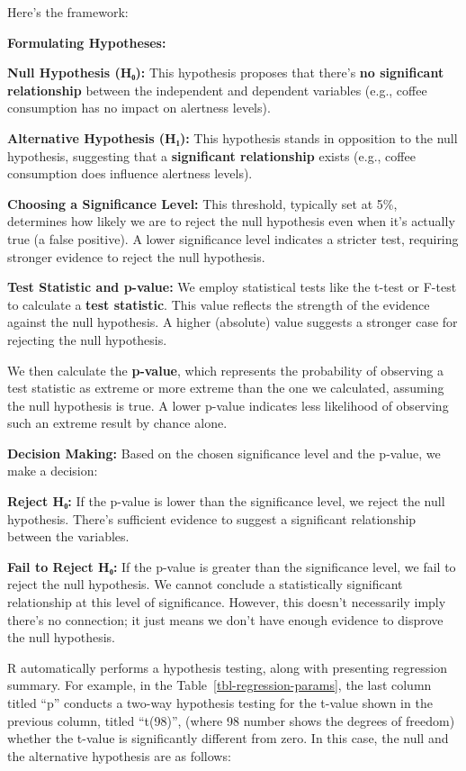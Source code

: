 \documentclass[
  letterpaper,
  paper =a4,
  twoside,
  openright,
  headsepline,
  footsepline,
  listof = totocnumbered,
  chapterprefix = true,
  firstiscover,
  parskip = full*]{scrbook}
\begin{document}
Here's the framework:

\textbf{Formulating Hypotheses:}

\textbf{Null Hypothesis (H₀):} This hypothesis proposes that there's
\textbf{no significant relationship} between the independent and
dependent variables (e.g., coffee consumption has no impact on alertness
levels).

\textbf{Alternative Hypothesis (H₁):} This hypothesis stands in
opposition to the null hypothesis, suggesting that a \textbf{significant
relationship} exists (e.g., coffee consumption does influence alertness
levels).

\textbf{Choosing a Significance Level:} This threshold, typically set at
5\%, determines how likely we are to reject the null hypothesis even
when it's actually true (a false positive). A lower significance level
indicates a stricter test, requiring stronger evidence to reject the
null hypothesis.

\textbf{Test Statistic and p-value:} We employ statistical tests like
the t-test or F-test to calculate a \textbf{test statistic}. This value
reflects the strength of the evidence against the null hypothesis. A
higher (absolute) value suggests a stronger case for rejecting the null
hypothesis.

We then calculate the \textbf{p-value}, which represents the probability
of observing a test statistic as extreme or more extreme than the one we
calculated, assuming the null hypothesis is true. A lower p-value
indicates less likelihood of observing such an extreme result by chance
alone.

\textbf{Decision Making:} Based on the chosen significance level and the
p-value, we make a decision:

\textbf{Reject H₀:} If the p-value is lower than the significance level,
we reject the null hypothesis. There's sufficient evidence to suggest a
significant relationship between the variables.

\textbf{Fail to Reject H₀:} If the p-value is greater than the
significance level, we fail to reject the null hypothesis. We cannot
conclude a statistically significant relationship at this level of
significance. However, this doesn't necessarily imply there's no
connection; it just means we don't have enough evidence to disprove the
null hypothesis.

R automatically performs a hypothesis testing, along with presenting
regression summary. For example, in the
Table~\ref{tbl-regression-params}, the last column titled ``p'' conducts
a two-way hypothesis testing for the t-value shown in the previous
column, titled ``t(98)'', (where 98 number shows the degrees of freedom)
whether the t-value is significantly different from zero. In this case,
the null and the alternative hypothesis are as follows:
\end{document}
